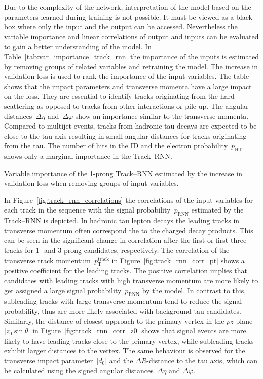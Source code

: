 Due to the complexity of the network, interpretation of the model based on the
parameters learned during training is not possible. It must be viewed as a black
box where only the input and the output can be accessed. Nevertheless the
variable importance and linear correlations of output and inputs can be
evaluated to gain a better understanding of the model. In
Table~\ref{tab:var_importance_track_rnn} the importance of the inputs is
estimated by removing groups of related variables and retraining the model. The
increase in validation loss is used to rank the importance of the input
variables. The table shows that the impact parameters and transverse momenta
have a large impact on the loss. They are essential to identify tracks
originating from the hard scattering as opposed to tracks from other
interactions or pile-up. The angular distances~$\Delta \eta$
and~$\Delta \varphi$ show an importance similar to the transverse momenta.
Compared to multijet events, tracks from hadronic tau decays are expected to be
close to the tau axis resulting in small angular distances for tracks
originating from the tau. The number of hits in the ID and the electron
probability~$p_\text{HT}$ shows only a marginal importance in the Track--RNN.

\begin{table}[htb]
  \centering
  {\small}
  \caption{Variable importance of the 1-prong Track--RNN estimated by the
    increase in validation loss when removing groups of input variables.}
  \label{tab:var_importance_track_rnn}
\end{table}

In Figure~\ref{fig:track_rnn_correlations} the correlations of the input
variables for each track in the sequence with the signal
probability~$p_\text{RNN}$ estimated by the Track--RNN is depicted. In hadronic
tau lepton decays the leading tracks in transverse momentum often correspond the
to the charged decay products. This can be seen in the significant change in
correlation after the first or first three tracks for 1- and 3-prong candidates,
respectively. The correlation of the transverse track
momentum~$p_\text{T}^\text{track}$ in Figure~\ref{fig:track_rnn_corr_pt} shows a
positive coefficient for the leading tracks. The positive correlation implies
that candidates with leading tracks with high transverse momentum are more
likely to get assigned a large signal probability~$p_\text{RNN}$ by the model.
In contrast to this, subleading tracks with large transverse momentum tend to
reduce the signal probability, thus are more likely associated with background
tau candidates. Similarly, the distance of closest approach to the primary
vertex in the $\rho z$-plane~$|z_0 \sin\theta|$ in
Figure~\ref{fig:track_rnn_corr_z0} shows that signal events are more likely to
have leading tracks close to the primary vertex, while subleading tracks exhibit
larger distances to the vertex. The same behaviour is observed for the
transverse impact parameter~$|d_0|$ and the $\Delta R$-distance to the tau axis,
which can be calculated using the signed angular distances~$\Delta \eta$ and
$\Delta \varphi$.

